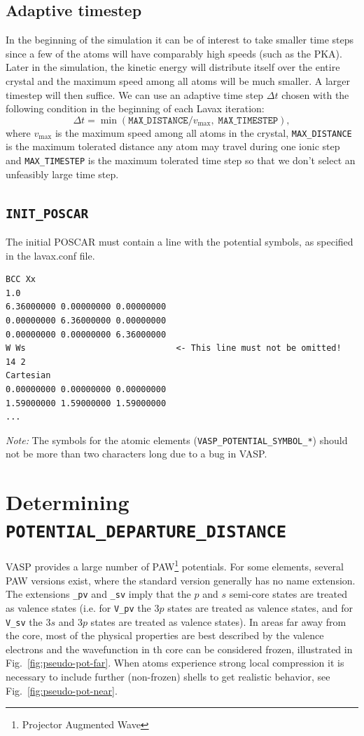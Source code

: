 \documentclass{article}
\begin{document}
\subsection{Adaptive timestep}
\label{sec:adaptive_timestep}
In the beginning of the simulation it can be of interest to take smaller time steps since a few of the atoms will have comparably high speeds (such as the PKA). Later in the simulation, the kinetic energy will distribute itself over the entire crystal and the maximum speed among all atoms will be much smaller.
A larger timestep will then suffice. We can use an adaptive time step $\Delta t$ chosen with the following condition in the beginning of each Lavax iteration:
\begin{equation*}
  \Delta t = \min{(\texttt{MAX\_DISTANCE}/v_{\text{max}},\; \texttt{MAX\_TIMESTEP})},
\end{equation*}
where $v_{\text{max}}$ is the maximum speed among all atoms in the crystal, \texttt{MAX\_DISTANCE} is the maximum tolerated distance any atom may travel during one ionic step and \texttt{MAX\_TIMESTEP} is the maximum tolerated time step so that we don't select an unfeasibly large time step.

\newpage
\subsection{\texttt{INIT\_POSCAR}}
The initial POSCAR must contain a line with the potential symbols, as specified in the lavax.conf file.
\begin{verbatim}
BCC Xx 
1.0
6.36000000 0.00000000 0.00000000
0.00000000 6.36000000 0.00000000
0.00000000 0.00000000 6.36000000
W Ws                              <- This line must not be omitted!
14 2
Cartesian
0.00000000 0.00000000 0.00000000
1.59000000 1.59000000 1.59000000
...
\end{verbatim}

\textit{Note: } The symbols for the atomic elements (\texttt{VASP\_POTENTIAL\_SYMBOL\_*}) should not be more than two characters long due to a bug in VASP.

\newpage
\section{Determining \texttt{POTENTIAL\_DEPARTURE\_DISTANCE}}
VASP provides a large number of PAW\footnote{Projector Augmented Wave} potentials. For some elements, several PAW versions exist, where the standard version generally has no name extension. The extensions \texttt{\_pv} and \texttt{\_sv} imply that the $p$ and $s$ semi-core states are treated as valence states (i.e. for \texttt{V\_pv} the $3p$ states are treated as valence states, and for \texttt{V\_sv} the $3s$ and $3p$ states are treated as valence states). In areas far away from the core, most of the physical properties are best described by the valence electrons and the wavefunction in th core can be considered frozen, illustrated in Fig.~\ref{fig:pseudo-pot-far}. When atoms experience strong local compression it is necessary to include further (non-frozen) shells to get realistic behavior, see Fig.~\ref{fig:pseudo-pot-near}.
\end{document}
